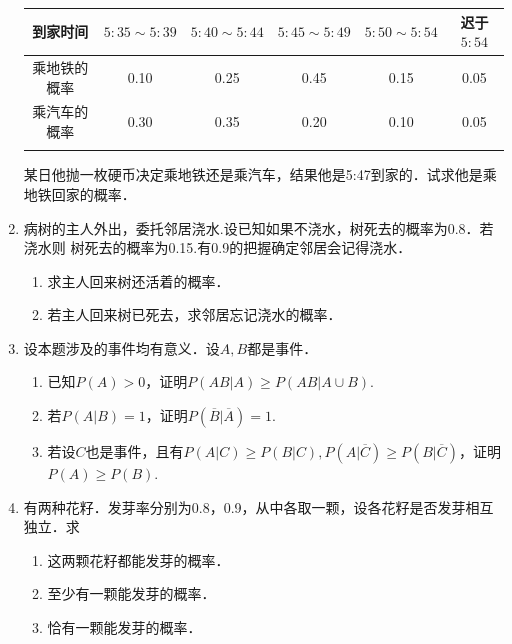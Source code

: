 \begin{enumerate}
    \begin{table}[H]\centering        
        \begin{tabular*}{\hsize}{cccccc}
        \hline
        \multicolumn{1}{c|}{到家时间}   & $5:35 \sim 5:39$     & $5:40 \sim 5:44$     & $5:45 \sim 5:49$     & $5:50 \sim 5:54$     & 迟于$5:54$             \\ \hline
        \multicolumn{1}{c|}{乘地铁的概率} & 0.10                 & 0.25                 & 0.45                 & 0.15                 & 0.05                 \\ \hline
        \multicolumn{1}{c|}{乘汽车的概率} & 0.30                 & 0.35                 & 0.20                 & 0.10                 & 0.05                 \\ \hline
        \multicolumn{1}{l}{}        & \multicolumn{1}{l}{} & \multicolumn{1}{l}{} & \multicolumn{1}{l}{} & \multicolumn{1}{l}{} & \multicolumn{1}{l}{}
        \end{tabular*}   
    \end{table}
    \vspace{-1cm}
    某日他抛一枚硬币决定乘地铁还是乘汽车，结果他是5:47到家的．试求他是乘地铁回家的概率．


    \item 病树的主人外出，委托邻居浇水.设已知如果不浇水，树死去的概率为0.8．若浇水则
    树死去的概率为0.15.有0.9的把握确定邻居会记得浇水．
    \begin{enumerate}
        \item 求主人回来树还活着的概率．
        \item 若主人回来树已死去，求邻居忘记浇水的概率．
    \end{enumerate}


    \item 设本题涉及的事件均有意义．设$A,B$都是事件．
    \begin{enumerate}
        \item 已知$P(A)>0$，证明$P(AB|A)\geq P(AB|A\cup B)$.
        \item 若$P(A|B)=1$，证明$P(\overline{B}|\overline{A})=1$.
        \item 若设$C$也是事件，且有$P(A|C)\geq P(B|C),P(A|\overline{C})\geq P(B|\overline{C})$，证明$P(A)\geq P(B)$.
    \end{enumerate}



    \item 有两种花籽．发芽率分别为0.8，0.9，从中各取一颗，设各花籽是否发芽相互独立．求
    \begin{enumerate}
        \item 这两颗花籽都能发芽的概率．
        \item 至少有一颗能发芽的概率．
        \item 恰有一颗能发芽的概率．
    \end{enumerate}




\end{enumerate}
